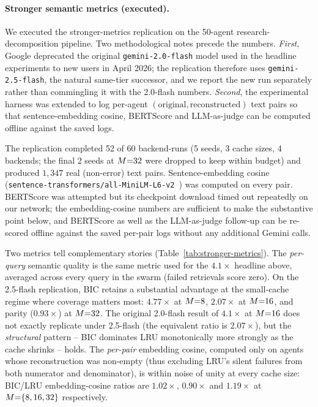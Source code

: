 \paragraph{Stronger semantic metrics (executed).}
\label{sec:stronger-metrics}
We executed the stronger-metrics replication on the 50-agent
research-decomposition pipeline. Two methodological notes precede the
numbers. \emph{First}, Google deprecated the original
\texttt{gemini-2.0-flash} model used in the headline experiments to
new users in April 2026; the replication therefore uses
\texttt{gemini-2.5-flash}, the natural same-tier successor, and we
report the new run separately rather than commingling it with the
2.0-flash numbers. \emph{Second}, the experimental harness was
extended to log per-agent $(\text{original}, \text{reconstructed})$
text pairs so that sentence-embedding cosine, BERTScore and
LLM-as-judge can be computed offline against the saved logs.

The replication completed 52 of 60 backend-runs (5 seeds, 3 cache
sizes, 4 backends; the final 2 seeds at $M{=}32$ were dropped to
keep within budget) and produced $1{,}347$ real
(non-error) text pairs. Sentence-embedding cosine
(\texttt{sentence-transformers/all-MiniLM-L6-v2}~\citep{reimers2019sbert})
was computed on every pair. BERTScore was attempted but its checkpoint
download timed out repeatedly on our network; the embedding-cosine
numbers are sufficient to make the substantive point below, and
BERTScore as well as the LLM-as-judge follow-up can be re-scored
offline against the saved per-pair logs without any additional
Gemini calls.

Two metrics tell complementary stories
(Table~\ref{tab:stronger-metrics}). The \emph{per-query} semantic
quality is the same metric used for the $4.1\times$ headline above,
averaged across every query in the swarm (failed retrievals score
zero). On the 2.5-flash replication, BIC retains a substantial
advantage at the small-cache regime where coverage matters most:
$4.77\times$ at $M{=}8$, $2.07\times$ at $M{=}16$, and
parity ($0.93\times$) at $M{=}32$. The original 2.0-flash result
of $4.1\times$ at $M{=}16$ does not exactly replicate under
2.5-flash (the equivalent ratio is $2.07\times$), but the
\emph{structural} pattern -- BIC dominates LRU monotonically more
strongly as the cache shrinks -- holds. The \emph{per-pair} embedding
cosine, computed only on agents whose reconstruction was non-empty
(thus excluding LRU's silent failures from both numerator and
denominator), is within noise of unity at every cache size: BIC/LRU
embedding-cosine ratios are $1.02\times$, $0.90\times$ and
$1.19\times$ at $M{=}\{8, 16, 32\}$ respectively.

